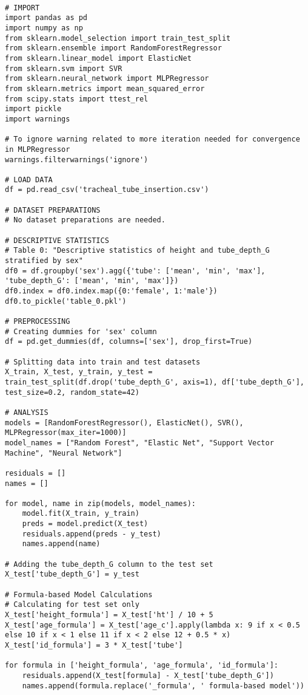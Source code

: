 \documentclass[11pt]{article}
\begin{document}
\begin{verbatim}

# IMPORT
import pandas as pd
import numpy as np
from sklearn.model_selection import train_test_split
from sklearn.ensemble import RandomForestRegressor
from sklearn.linear_model import ElasticNet
from sklearn.svm import SVR
from sklearn.neural_network import MLPRegressor
from sklearn.metrics import mean_squared_error
from scipy.stats import ttest_rel
import pickle
import warnings

# To ignore warning related to more iteration needed for convergence in MLPRegressor
warnings.filterwarnings('ignore')

# LOAD DATA
df = pd.read_csv('tracheal_tube_insertion.csv')

# DATASET PREPARATIONS
# No dataset preparations are needed.

# DESCRIPTIVE STATISTICS
# Table 0: "Descriptive statistics of height and tube_depth_G stratified by sex"
df0 = df.groupby('sex').agg({'tube': ['mean', 'min', 'max'], 'tube_depth_G': ['mean', 'min', 'max']})
df0.index = df0.index.map({0:'female', 1:'male'})
df0.to_pickle('table_0.pkl')

# PREPROCESSING 
# Creating dummies for 'sex' column
df = pd.get_dummies(df, columns=['sex'], drop_first=True)

# Splitting data into train and test datasets
X_train, X_test, y_train, y_test = train_test_split(df.drop('tube_depth_G', axis=1), df['tube_depth_G'], test_size=0.2, random_state=42)

# ANALYSIS
models = [RandomForestRegressor(), ElasticNet(), SVR(), MLPRegressor(max_iter=1000)]
model_names = ["Random Forest", "Elastic Net", "Support Vector Machine", "Neural Network"]

residuals = []
names = []

for model, name in zip(models, model_names):
    model.fit(X_train, y_train)
    preds = model.predict(X_test)
    residuals.append(preds - y_test)
    names.append(name)

# Adding the tube_depth_G column to the test set
X_test['tube_depth_G'] = y_test

# Formula-based Model Calculations
# Calculating for test set only
X_test['height_formula'] = X_test['ht'] / 10 + 5
X_test['age_formula'] = X_test['age_c'].apply(lambda x: 9 if x < 0.5 else 10 if x < 1 else 11 if x < 2 else 12 + 0.5 * x)
X_test['id_formula'] = 3 * X_test['tube']

for formula in ['height_formula', 'age_formula', 'id_formula']:
    residuals.append(X_test[formula] - X_test['tube_depth_G'])
    names.append(formula.replace('_formula', ' formula-based model'))


\end{verbatim}
\end{document}
